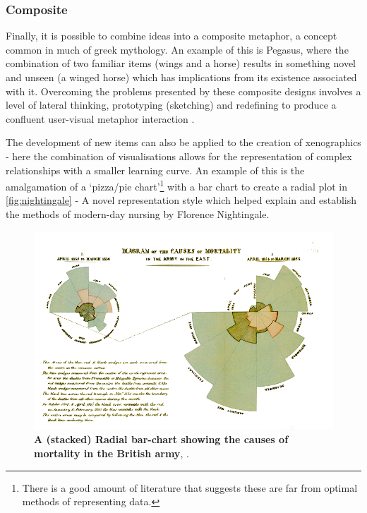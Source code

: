 \subsubsection{Composite}\label{sec:metcom}

Finally, it is possible to combine ideas into a composite metaphor, a concept common in much of greek mythology. An example of this is Pegasus, where the combination of two familiar items (wings and a horse) results in something novel and unseen (a winged horse) which has implications from its existence associated with it.
Overcoming the problems presented by these composite designs involves a level of lateral thinking, prototyping (sketching) and redefining to produce a confluent user-visual metaphor interaction \citep{shapinginfo,fds}.

The development of new items can also be applied to the creation of xenographics -  here the combination of visualisations allows for the representation of complex relationships with a smaller learning curve. An example of this is the amalgamation of a  `pizza/pie chart'\footnote{There is a good amount of literature that suggests these are far from optimal methods of representing data. } with a bar chart to create a radial plot in \autoref{fig:nightingale} - A novel representation style which helped explain and establish the methods of modern-day nursing by Florence Nightingale.



\begin{figure}[H]
     \centering
         \includegraphics[width=.8\textwidth]{figures_c1/nightingale.png}
        \caption[Caption for LOF]{\textbf{A (stacked) Radial bar-chart showing the causes of mortality in the British army}\protect\footnotemark , \citep{nightingale}.}
        \label{fig:nightingale}
\end{figure}




